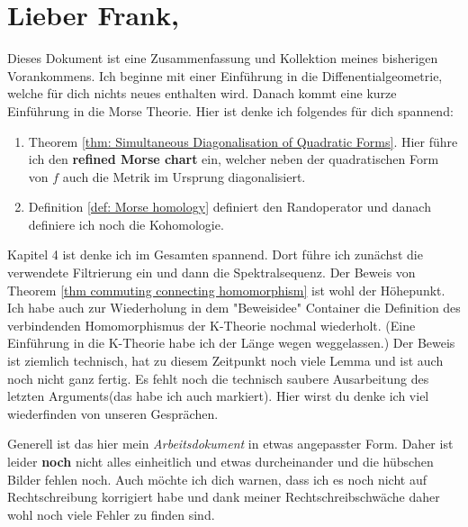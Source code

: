 
\pagestyle{empty}
\section*{Lieber Frank,}
Dieses Dokument ist eine Zusammenfassung und Kollektion meines bisherigen Vorankommens. Ich beginne mit einer Einführung in die Diffenentialgeometrie, welche für dich nichts neues enthalten wird. Danach kommt eine kurze Einführung in die Morse Theorie. Hier ist denke ich folgendes für dich spannend: 
\begin{enumerate}
	\item Theorem \ref{thm: Simultaneous Diagonalisation of Quadratic Forms}. Hier führe ich den \textbf{refined Morse chart} ein, welcher neben der quadratischen Form von $f$ auch die Metrik im Ursprung diagonalisiert. 
	\item Definition \ref{def: Morse homology} definiert den Randoperator und danach definiere ich noch die Kohomologie.
\end{enumerate}
Kapitel 4 ist denke ich im Gesamten spannend. Dort führe ich zunächst die verwendete Filtrierung ein und dann die Spektralsequenz. Der Beweis von Theorem \ref{thm commuting connecting homomorphism} ist wohl der Höhepunkt. Ich habe auch zur Wiederholung in dem "Beweisidee" Container die Definition des verbindenden Homomorphismus der K-Theorie nochmal wiederholt. (Eine Einführung in die K-Theorie habe ich der Länge wegen weggelassen.) Der Beweis ist ziemlich technisch, hat zu diesem Zeitpunkt noch viele Lemma und ist auch noch nicht ganz fertig. Es fehlt noch die technisch saubere Ausarbeitung des letzten Arguments(das habe ich auch markiert). Hier wirst du denke ich viel wiederfinden von unseren Gesprächen.

Generell ist das hier mein \textit{Arbeitsdokument} in etwas angepasster Form. Daher ist leider \textbf{noch} nicht alles einheitlich und etwas durcheinander und die hübschen Bilder fehlen noch. Auch möchte ich dich warnen, dass ich es noch nicht auf Rechtschreibung korrigiert habe und dank meiner Rechtschreibschwäche daher wohl noch viele Fehler zu finden sind.
\newpage
\pagestyle{scrheadings}
